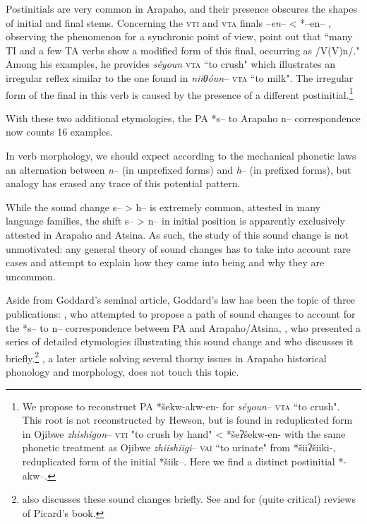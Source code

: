 \documentclass[oldfontcommands,oneside,a4paper,11pt]{article}
\begin{document}
\begin{itemize}
 Postinitials are very common in Arapaho, and their presence obscures the shapes of initial and final stems. Concerning the \textsc{vti} and \textsc{vta} finals   --\textit{en}-- < *--en--
\citet[145]{cowell06arapaho}, observing the phenomenon for a synchronic point of view, point  out  that  ``many TI and a few TA verbs show a modified form of this final, occurring as /V(V)n/." Among his examples, he provides \textit{séyoun} \textsc{vta} ``to crush" which illustrates an irregular reflex similar to the one found in \textit{niiθóun}-- \textsc{vta} ``to milk". The irregular form of the final in this verb is caused by the presence of a different postinitial.\footnote{We propose to reconstruct PA *šekw-akw-en- for \textit{séyoun}-- \textsc{vta} ``to crush". This root is not reconstructed by Hewson, but is found in reduplicated form in  Ojibwe \textit{zhishigon}-- \textsc{vti} "to crush by hand" < *šeʔšekw-en-  with the same phonetic treatment as Ojibwe \textit{zhiishiigi}-- \textsc{vai} ``to urinate"  from *šiiʔšiiki-, reduplicated form of the initial *šiik--. Here we find a distinct postinitial *-akw--.}

\end{itemize}

With these two additional etymologies, the PA *s-- to Arapaho n-- correspondence now counts 16 examples. 

In verb morphology, we should expect according to the mechanical phonetic laws an alternation between \textit{n}-- (in unprefixed forms) and \textit{h}-- (in prefixed forms), but analogy has erased any trace of this potential pattern.

While the sound change s-- > h-- is extremely common, attested in many language families, the shift s-- > n-- in initial position is apparently exclusively attested in Arapaho and Atsina. As such, the study of this sound change is not unmotivated: any general theory of sound changes has to take into account rare cases and attempt to explain how they came into being and why they are uncommon.

Aside from Goddard's seminal article, Goddard's law has been the topic of three publications: \citet{picard94sn}, who   attempted to propose a path of sound changes to account for the *s-- to n-- correspondence between PA and Arapaho/Atsina, \citet{pentland98}, who presented a series of detailed etymologies illustrating this sound change and  \citet{goddard01plains} who discusses it briefly.\footnote{\citet{picard94} also discusses these sound changes briefly. See \citet{goddard95review} and \citet{pentland97} for (quite critical) reviews of Picard's book.} \citet{goddard98arapaho}, a later article solving several thorny issues in Arapaho historical phonology and morphology, does not touch this topic.
\end{document}
